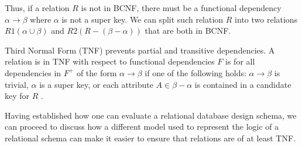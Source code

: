 Thus, if a relation $R$ is not in BCNF, there must be a functional dependency $\alpha \rightarrow \beta$ where $\alpha$ is not a super key. 
We can split such relation $R$ into two relations $R1(\alpha \cup \beta)$ and $R2(R-(\beta-\alpha))$ that are both in BCNF.

Third Normal Form (TNF) prevents partial and transitive dependencies\cite{MontayaNormalForms}.
A relation is in TNF with respect to functional dependencies $F$ is for all dependencies in $F^+$ of the form $\alpha \rightarrow \beta$ if one of the following holds: 
$\alpha \rightarrow \beta$ is trivial, $\alpha$ is a super key, or each attribute $A \in \beta-\alpha$ is contained in a candidate key for $R$ \cite{DBSBook}.

Having established how one can evaluate a relational database design schema, we can proceed to discuss how a different model used to represent the logic of a relational schema can make it easier to ensure that relations are of at least TNF.
